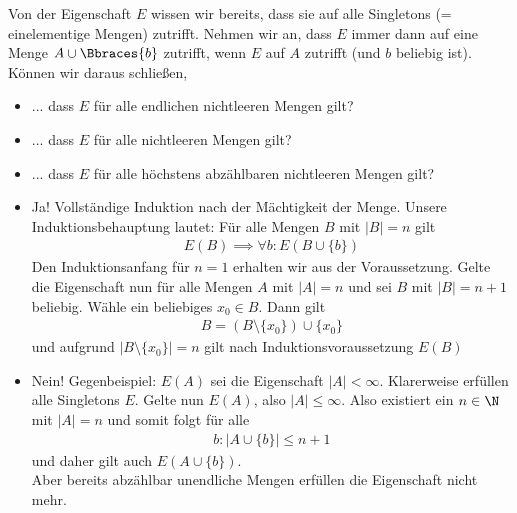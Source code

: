 
\begin{exercise}[2]

Von der Eigenschaft $E$ wissen wir bereits, dass sie auf alle Singletons (= einelementige Mengen) zutrifft.
Nehmen wir an, dass $E$ immer dann auf eine Menge $A \cup \Bbraces{b}$ zutrifft, wenn $E$ auf $A$ zutrifft (und $b$ beliebig ist).
Können wir daraus schließen,

\begin{itemize}
    \item ... dass $E$ für alle endlichen nichtleeren Mengen gilt?
    \item ... dass $E$ für alle nichtleeren Mengen gilt?
    \item ... dass $E$ für alle höchstens abzählbaren nichtleeren Mengen gilt?
\end{itemize}

\end{exercise}


\begin{solution}
\phantom{}
\begin{itemize}
    \item Ja! Vollständige Induktion nach der Mächtigkeit der Menge.
    Unsere Induktionsbehauptung lautet: Für alle Mengen $B$ mit $|B| = n$ gilt
    \begin{align*}
      E(B) \implies \forall b: E(B \cup \{b\})
    \end{align*}
    Den Induktionsanfang für $n = 1$ erhalten wir aus der Voraussetzung.
    Gelte die Eigenschaft nun für alle Mengen $A$ mit $|A| = n$ und sei $B$
    mit $|B| = n + 1$ beliebig. Wähle ein beliebiges $x_0  \in B$. Dann gilt
    \begin{align*}
      B = \left(B\setminus\{x_0\}\right) \cup \{x_0\}
    \end{align*}
    und aufgrund $|B\setminus\{x_0\}| = n$ gilt nach Induktionsvoraussetzung $E(B)$
    \item Nein! Gegenbeispiel: $E(A)$ sei die Eigenschaft $|A| < \infty$.
    Klarerweise erfüllen alle Singletons $E$.
    Gelte nun $E(A)$, also $|A| \leq \infty$. Also existiert ein $n \in \N$
    mit $|A| = n$ und somit folgt für alle
    \begin{align*}
      b: |A \cup \{b\}| \leq n + 1
    \end{align*} und daher gilt auch $E(A \cup \{b\})$. \\
    Aber bereits abzählbar unendliche Mengen erfüllen die Eigenschaft nicht mehr.
\end{itemize}

\end{solution}

